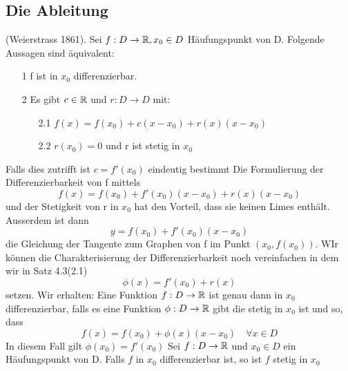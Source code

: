 \subsection{Die Ableitung}
\Satz[4.3](Weierstrass 1861). Sei \(f: D \rightarrow \mathbb{R}, x_0 \in D\) Häufungspunkt von D. Folgende Aussagen sind äquivalent:
\begin{enumerate}
    \item [1] f ist in \(x_0\) differenzierbar.
    \item [2] Es gibt \(c \in \mathbb{R} \) und \(r: D \rightarrow D \) mit:
    \begin{enumerate}
        \item  [2.1] \(f(x) = f(x_0) + c(x - x_0) + r(x)(x-x_0)\)
        \item  [2.2] \(r(x_0) = 0 \) und r ist stetig in \(x_0\)
    \end{enumerate} 
\end{enumerate}
Falls dies zutrifft ist \(c = f'(x_0)\) eindeutig bestimmt
Die Formulierung der Differenzierbarkeit von f mittels
\[ f(x) = f(x_0) + f'(x_0)(x - x_0) + r(x)(x - x_0)\]
und der Stetigkeit von r in \(x_0\) hat den Vorteil, dass sie keinen Limes enthält. Ausserdem ist dann
\[ y = f(x_0) + f'(x_0)(x - x_0)\]
die Gleichung der Tangente zum Graphen von f im Punkt \( (x_0, f(x_0))\).
WIr können die Charakterisierung der Differenzierbarkeit noch vereinfachen in dem wir in Satz 4.3(2.1)
\[ \phi(x) = f'(x_0) + r(x)\]
setzen. Wir erhalten: \newline
\Satz[4.4]Eine Funktion \( f: D \rightarrow \mathbb{R}\) ist genau dann in \(x_0\) differenzierbar, falls es eine Funktion \(\phi : D \rightarrow \mathbb{R} \) gibt die stetig in \(x_0\) ist und so, dass
\[f(x) = f(x_0) + \phi(x)(x - x_0) \quad \forall x \in D\]
In diesem Fall gilt \(\phi(x_0) = f'(x_0)\) \newline
\Korollar[4.5] Sei \(f : D \rightarrow \mathbb{R} \) und \(x_0 \in D \) ein Häufungspunkt von D. Falls \(f\) in \(x_0\) differenzierbar ist, so ist \(f\) stetig in \(x_0\) \newline
